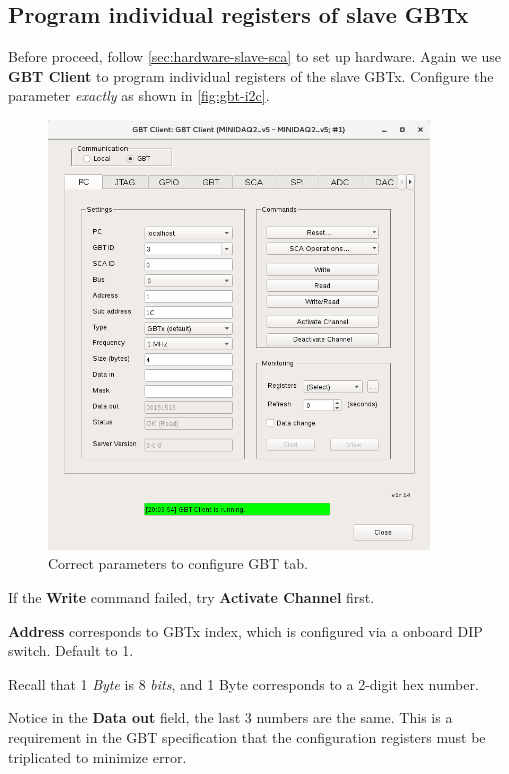 \subsection{Program individual registers of slave GBTx}
\label{sec:software-slave-individual}
Before proceed, follow \autoref{sec:hardware-slave-sca} to set up hardware.
Again we use \textbf{GBT Client} to program individual registers of the slave
GBTx.
Configure the parameter \emph{exactly} as shown in \autoref{fig:gbt-i2c}.

\begin{figure}[ht]
    \centering
    \includegraphics[width=0.9\textwidth]{res/gbt_client_slave_gbt_i2c_test.png}
    \caption{Correct parameters to configure GBT \itwoc tab.}
    \label{fig:gbt-i2c}
\end{figure}

\begin{leftbar}
    If the \textbf{Write} command failed, try \textbf{Activate Channel} first.
\end{leftbar}

\begin{leftbar}
    \textbf{Address} corresponds to GBTx index, which is configured via a
    onboard DIP switch. Default to 1.
\end{leftbar}

\begin{leftbar}
    Recall that 1 \emph{Byte} is 8 \emph{bits}, and 1 Byte corresponds to a
    2-digit hex number.
\end{leftbar}

\begin{leftbar}
    Notice in the \textbf{Data out} field, the last 3 numbers are the same.
    This is a requirement in the GBT specification that the configuration
    registers must be triplicated to minimize error.
\end{leftbar}
